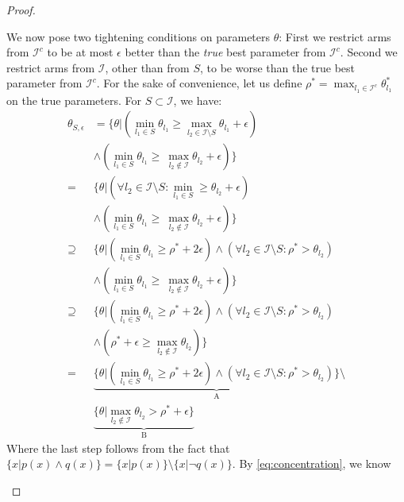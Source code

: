 \begin{proof}
\begin{itemize}
  We now pose two tightening conditions on parameters $\theta$: First we
  restrict arms from $\mathcal{I}^c$ to be at most $\epsilon$ better than the
  \emph{true} best parameter from $\mathcal{I}^c$. Second we restrict arms from
  $\mathcal{I}$, other than from $S$, to be worse than the true best parameter
  from $\mathcal{I}^c$. For the sake of convenience, let us define $\rho^* =
  \max_{l_1 \in \mathcal{I}^c} \theta^*_{l_1}$ on the true parameters. For $S
  \subset \mathcal{I}$, we have:
  \begin{align}
    \theta_{S, \epsilon} &= \{\theta|(\min_{l_1 \in S} \theta_{l_1} \geq
        \max_{l_2 \in \mathcal{I} \setminus S} \theta_{l_1} + \epsilon)
        \nonumber \\
      & \wedge (\min_{l_1 \in S} \theta_{l_1} \geq\ \max_{l_2 \notin
          \mathcal{I}} \theta_{l_2} + \epsilon)\} \\
      =& \{\theta | (\forall l_2 \in \mathcal{I} \setminus S: \min_{l_1 \in S} \geq
          \theta_{l_2} + \epsilon) \nonumber \\
      & \wedge (\min_{l_1 \in S} \theta_{l_1} \geq\ \max_{l_2 \notin
          \mathcal{I}} \theta_{l_2} + \epsilon)\} \\
      \supseteq &  \{\theta |(\min_{l_1 \in S} \theta_{l_1} \geq \rho^* + 2
          \epsilon) \wedge (\forall {l_2} \in \mathcal{I} \setminus S: \rho^* >
          \theta_{l_2}) \nonumber \\
      & \wedge (\min_{l_1 \in S} \theta_{l_1} \geq\ \max_{l_2 \notin
          \mathcal{I}} \theta_{l_2} + \epsilon)\} \\
      \supseteq & \{\theta |(\min_{l_1 \in S} \theta_{l_1} \geq \rho^* + 2
            \epsilon) \wedge (\forall l_2 \in \mathcal{I} \setminus S: \rho^* >
            \theta_{l_2}) \nonumber \\
      & \wedge (\rho^* + \epsilon \geq \max_{l_2 \notin \mathcal{I}}
          \theta_{l_2})\} \\
      = & \underbrace{\{\theta |(\min_{l_1 \in S} \theta_{l_1} \geq \rho^* + 2
          \epsilon) \wedge (\forall l_2 \in \mathcal{I} \setminus S: \rho^* >
          \theta_{l_2}) \}}_\text{A} \setminus \nonumber \\
      & \underbrace{\{\theta| \max_{l_2 \notin \mathcal{I}} \theta_{l_2} >
          \rho^* + \epsilon\}}_\text{B}
  \end{align}
  Where the last step follows from the fact that $\{x|p(x) \wedge q(x)\} =
  \{x|p(x)\} \setminus \{x|\neg q(x)\}$. By \eqref{eq:concentration}, we know

\end{itemize}
\end{proof}
